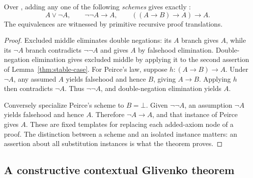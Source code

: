 \begin{theorem}\label{thm:classical-schemes}
Over \IPC, adding any one of the following \emph{schemes} gives exactly
\CPC:
\[
 A\vee\neg A,\qquad \neg\neg A\to A,\qquad
 ((A\to B)\to A)\to A.
\]
The equivalences are witnessed by primitive recursive proof translations.
\end{theorem}
\begin{proof}
Excluded middle eliminates double negations: its $A$ branch gives $A$,
while its $\neg A$ branch contradicts $\neg\neg A$ and gives $A$ by
falsehood elimination. Double-negation elimination gives excluded middle
by applying it to the second assertion of Lemma~\ref{thm:stable-case}.
For Peirce's law, suppose $h:(A\to B)\to A$. Under $\neg A$, any
assumed $A$ yields falsehood and hence $B$, giving $A\to B$. Applying
$h$ then contradicts $\neg A$. Thus $\neg\neg A$, and double-negation
elimination yields $A$.

Conversely specialize Peirce's scheme to $B=\bot$. Given $\neg\neg A$,
an assumption $\neg A$ yields falsehood and hence $A$. Therefore
$\neg A\to A$, and that instance of Peirce gives $A$. These are fixed
templates for replacing each added-axiom node of a proof. The distinction
between a scheme and an isolated instance matters: an assertion about
all substitution instances is what the theorem proves.
\end{proof}

\subsection{A constructive contextual Glivenko theorem}


